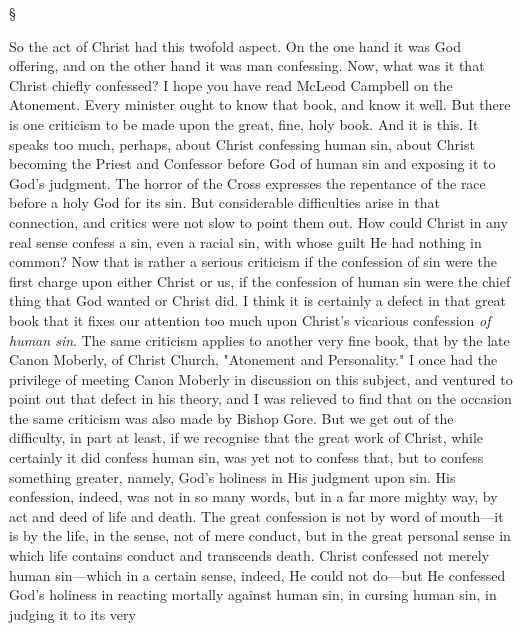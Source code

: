 \documentclass[12pt,a5paper,twoside,titlepage]{book}
\begin{document}
\begin{center}
\S
\end{center}

So the act of Christ had this twofold aspect. 
On the one hand it was God offering, and on the 
other hand it was man confessing. Now, what 
was it that Christ chiefly confessed? I hope you 
have read McLeod Campbell on the Atonement. 
Every minister ought to know that book, and 
know it well. But there is one criticism to be 
made upon the great, fine, holy book. And it 
is this. It speaks too much, perhaps, about 
Christ confessing human sin, about Christ 
becoming the Priest and Confessor before God 
of human sin and exposing it to God's judgment. 
The horror of the Cross expresses the repentance 
of the race before a holy God for its sin. 
But considerable difficulties arise in that connection, 
and critics were not slow to point them 
out. How could Christ in any real sense confess 
a sin, even a racial sin, with whose guilt He 
had nothing in common? Now that is rather a 
serious criticism if the confession of sin were 
the first charge upon either Christ or us, if the 
confession of human sin were the chief thing 
that God wanted or Christ did. I think it is 
certainly a defect in that great book that 
it fixes our attention too much upon Christ's 
vicarious confession \textit{of human sin}. The same 
criticism applies to another very fine book, 
that by the late Canon Moberly, of Christ 
Church, "Atonement and Personality." I once 
had the privilege of meeting Canon Moberly 
in discussion on this subject, and ventured to 
point out that defect in his theory, and I was 
relieved to find that on the occasion the same 
criticism was also made by Bishop Gore. But 
we get out of the difficulty, in part at least, if we 
recognise that the great work of Christ, while 
certainly it did confess human sin, was yet not 
to confess that, but to confess something greater, 
namely, God's holiness in His judgment upon 
sin. His confession, indeed, was not in so many 
words, but in a far more mighty way, by act and 
deed of life and death. The great confession is 
not by word of mouth---it is by the life, in the 
sense, not of mere conduct, but in the great 
personal sense in which life contains conduct 
and transcends death. Christ confessed not 
merely human sin---which in a certain sense, 
indeed, He could not do---but He confessed God's 
holiness in reacting mortally against human sin, 
in cursing human sin, in judging it to its very 
\end{document}
